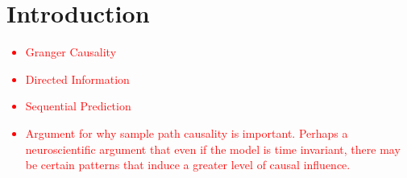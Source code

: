 \section{Introduction}

\textcolor{red}
{\begin{itemize}
    \item Granger Causality
    \item Directed Information
    \item Sequential Prediction
    \item Argument for why sample path causality is important. Perhaps a neuroscientific argument that even if the model is time invariant, there may be certain patterns that induce a greater level of causal influence.
\end{itemize}}


